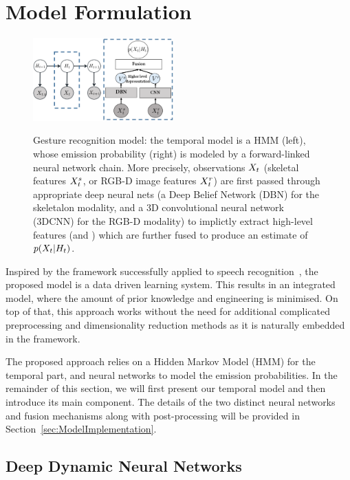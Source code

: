 

\section{Model Formulation}
\label{sec:approach}

\begin{figure}[t]
  \centering
  \includegraphics[width=0.48\textwidth]{images/GraphicalModel_new2}\\
  \caption{Gesture recognition model: the temporal model is a HMM (left), whose emission probability
\emissionprob{} (right) is modeled by a forward-linked neural network chain.
More precisely, observations $X_t$ (skeletal features $X^{s}_t$, or RGB-D image features $X^{r}_t$)
are first passed through appropriate deep neural nets (a Deep Belief Network (DBN) for the skeletalon modality, and
 a 3D convolutional neural network (3DCNN) for the RGB-D modality) to implictly extract high-level features (\highSK and \highRGBD)
which are further fused to produce an estimate of $p(X_t|H_t)$.
}
\label{fig:GM}
\end{figure}

Inspired by the framework successfully applied to speech recognition~\cite{mohamed2012acoustic}, the proposed model is a data driven learning system. This results in an integrated model, where the amount of prior knowledge and engineering is minimised. On top of that, this approach works without the need for additional complicated preprocessing and dimensionality reduction methods as it is naturally embedded in the framework.

The proposed approach relies on a Hidden Markov Model (HMM) for the temporal part,
and neural networks to model the emission probabilities.
 In the remainder of this section, we will first present our temporal model and then introduce its main component.
The details of the two distinct neural networks and fusion mechanisms along with post-processing will be provided
in Section~\ref{sec:ModelImplementation}.


\subsection{Deep Dynamic Neural Networks}
\label{sec:DDNN}

